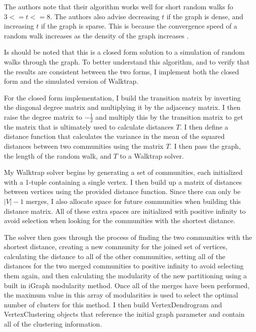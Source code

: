 \documentclass{article}
\begin{document}
    The authors note that their algorithm works well for short random walks fo $3 <= t <= 8$. The authors also advise decreasing $t$ if the graph is dense, and increasing $t$ if the graph is sparse. This is because the convergence speed of a random walk increases as the density of the graph increases \cite{10.1007/11569596_31}.
    \par
    Is should be noted that this is a closed form solution to a simulation of random walks through the graph. To better understand this algorithm, and to verify that the results are consistent between the two forms, I implement both the closed form and the simulated version of Walktrap.
    \par
    For the closed form implementation, I build the transition matrix by inverting the diagonal degree matrix and multiplying it by the adjacency matrix. I then raise the degree matrix to $-\frac{1}{2}$ and multiply this by the transition matrix to get the matrix that is ultimately used to calculate distances $T$. I then define a distance function that calculates the variance in the mean of the squared distances between two communities using the matrix $T$. I then pass the graph, the length of the random walk, and $T$ to a Walktrap solver.
    \par
    My Walktrap solver begins by generating a set of communities, each initialized with a 1-tuple containing a single vertex. I then build up a matrix of distances between vertices using the provided distance function. Since there can only be $|V| - 1$ merges, I also allocate space for future communities when building this distance matrix. All of these extra spaces are initialized with positive infinity to avoid selection when looking for the communities with the shortest distance.
    \par
    The solver then goes through the process of finding the two communities with the shortest distance, creating a new community for the joined set of vertices, calculating the distance to all of the other communities, setting all of the distances for the two merged communities to positive infinity to avoid selecting them again, and then calculating the modularity of the new partitioning using a built in iGraph modularity method. Once all of the merges have been performed, the maximum value in this array of modularities is used to select the optimal number of clusters for this method. I then build VertexDendrogram and VertexClustering objects that reference the initial graph parameter and contain all of the clustering information.
    \par
\end{document}
